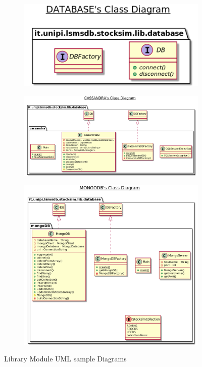\begin{figure}[H]
\begin{subfigure}{.3\textwidth}
\end{subfigure}
\hspace{4.0cm}
\begin{subfigure}{.3\textwidth}
  \includegraphics[scale=0.2]{plantuml/library/database.png}
\end{subfigure}
\end{figure}
\begin{figure}[H]
\begin{subfigure}{.5\textwidth}
  \hspace{-3.0cm}
  \includegraphics[scale=0.2]{plantuml/library/cassandra.png}
\end{subfigure}%
\hspace{1.0cm}
\begin{subfigure}{.5\textwidth}
  \includegraphics[scale=0.2]{plantuml/library/mongoDB.png}
\end{subfigure}
\caption{Library Module UML sample Diagrams}
\end{figure}
